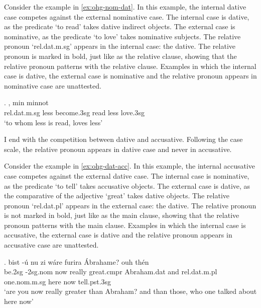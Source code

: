 Consider the example in \ref{ex:ohg-nom-dat}. In this example, the internal dative case competes against the external nominative case.
The internal case is dative, as the predicate  `to read' takes dative indirect objects.
The external case is nominative, as the predicate  `to love' takes nominative subjects.
The relative pronoun  `\ac{rel}.\ac{dat}.\ac{m}.\ac{sg}' appears in the internal case: the dative. The relative pronoun is marked in bold, just like as the relative clause, showing that the relative pronoun patterns with the relative clause.
Examples in which the internal case is dative, the external case is nominative and the relative pronoun appears in nominative case are unattested.

\exg.    , min minnot\\
\ac{rel}.\ac{dat}.\ac{m}.\ac{sg} less become.3\ac{sg} read\scsub{[dat]} less love.3\ac{sg}\scsub{[nom]}\\
`to whom less is read, loves less' \label{ex:ohg-nom-dat}

I end with the competition between dative and accusative. Following the case scale, the relative pronoun appears in dative case and never in accusative.

Consider the example in \ref{ex:ohg-dat-acc}. In this example, the internal accusative case competes against the external dative case.
The internal case is nominative, as the predicate  `to tell' takes accusative objects.
The external case is dative, as the comparative of the adjective  `great' takes dative objects.
The relative pronoun  `\ac{rel}.\ac{dat}.\ac{pl}' appears in the external case: the dative. The relative pronoun is not marked in bold, just like as the main clause, showing that the relative pronoun patterns with the main clause.
Examples in which the internal case is accusative, the external case is dative and the relative pronoun appears in accusative case are unattested.

\exg. bist -ú nu {zi wáre} furira Ábrahame? ouh thén    \\
be.2\ac{sg} -2\ac{sg}.\ac{nom} now really {great}.\ac{cmpr}\scsub{[dat]} Abraham.\ac{dat} and \ac{rel}.\ac{dat}.\ac{m}.\ac{pl} one.\ac{nom}.\ac{m}.\ac{sg} here now tell.\ac{pst}.3\ac{sg}\scsub{[acc]}\\
`are you now really greater than Abraham? and than those, who one talked about here now' \label{ex:ohg-dat-acc}

